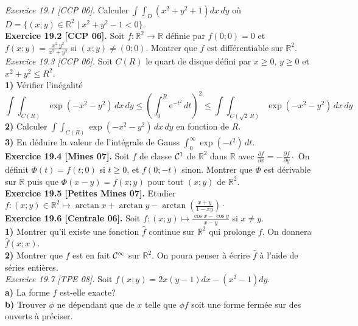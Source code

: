 \documentclass[a4paper,12pt,francais]{article}
\newcommand{\field}[1]{\mathbb{#1}}
\newcommand{\R}{\field{R}}
\newcommand{\e}{\mbox{e}}
\begin{document}
\noindent
{\it Exercice 19.1 [CCP 06].} Calculer $\int\int_D (x^2+y^2+1)dx \,
dy$ où $D=\{(x;y)\in \R^2 \; |\; x^2+y^2-1<0\}$.\\

\noindent
{\bf Exercice 19.2 [CCP 06].} Soit $f:\R^2 \to \R$ définie par
$f(0;0)=0$ et $f(x;y)=\frac{x^2\, y^2}{x^2+y^2}$ si $(x;y)\neq
(0;0)$. Montrer que $f$ est différentiable sur $\R^2$.\\

\noindent
{\it Exercice  19.3 [CCP 06].} Soit $C(R)$ le quart de disque défini
par $x \geqslant0$, $y\geqslant 0$ et $x^2+y^2\leqslant R^2$.\\
{\bf 1)} Vérifier l'inégalité 
$$\int \int_{C(R)} \exp(-x^2-y^2) \, dx \, dy \leqslant 
\left(\int_0^R \e^{-t^2}\,dt\right)^2
\leqslant
\int \int_{C(\sqrt{2} \, R)} \exp(-x^2-y^2) \, dx \, dy$$
{\bf 2)} Calculer $\int \int_{C(R)} \exp(-x^2-y^2) \, dx \, dy$ en
fonction de $R$.\\
{\bf 3)} En déduire la valeur de l'intégrale de Gauss $\displaystyle
\int_0^\infty \exp(-t^2) \, dt$.\\

\noindent
{\bf Exercice 19.4 [Mines 07].} Soit $f$ de classe ${\cal{C}}^1$ de $\R^2$ dans $\R$ avec $\frac{\partial f}{\partial x }=-\frac{\partial f}{\partial y} \cdot$ On définit $\Phi(t)=f(t;0)$ si $t \geqslant 0$, et $f(0;-t)$ sinon. Montrer que $\Phi$ est dérivable sur $\R$ puis que $\Phi(x-y)=f(x;y)$ pour tout $(x;y)$ de $\R^2$.\\

\noindent
{\bf Exercice 19.5 [Petites Mines 07].} Etudier $\displaystyle f:(x;y)\in \R^2 \mapsto \arctan x+\arctan y -\arctan \left( \frac{x+y}{1-xy} \right) \cdot$\\ 

\noindent
{\bf Exercice 19.6 [Centrale 06].} Soit $f:(x;y) \mapsto \frac{\cos x- \cos y}{x-y}$ si $x\neq y$.\\
\indent
{\bf 1)} Montrer qu'il existe une fonction $\hat{f}$ continue sur $\R^2$ qui prolonge $f$. On donnera $\hat{f}(x;x)$.\\
\indent
{\bf 2)} Montrer que $\hat{f}$ est en fait ${\cal{C}}^\infty$ sur $\R^2$. On poura penser à écrire $\hat{f}$ à l'aide de séries entières.\\

\noindent
{\it  Exercice 19.7 [TPE 08].} Soit $f(x;y)=2x(y-1)dx-(x^2-1)dy$.\\
{\bf a)} La forme $f$ est-elle exacte?\\
{\bf b)} Trouver $\phi$ ne dépendant que de $x$ telle que $\phi f$ soit une forme fermée sur des ouverts à préciser.\\
\end{document}
